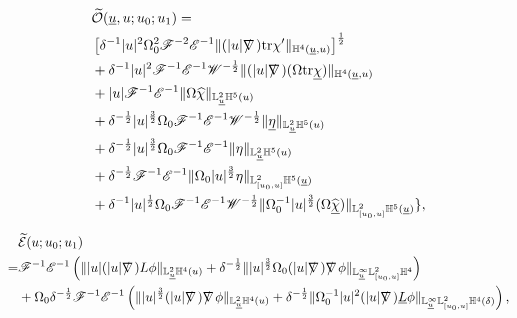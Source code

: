 \documentclass[11pt,reqno]{amsart}
\theoremstyle{definition}
\numberwithin{equation}{section}
\newcommand{\tr}{\mathrm{tr}}
\renewcommand{\L}{\mathbb{L}}
\renewcommand{\H}{\mathbb{H}}
\def\chib{\underline{\chi}}
\def\chibh{\widehat{\underline{\chi}}}
\def\chih{\widehat{\chi}}
\def\etab{\underline{\eta}}
\def\Lb{\underline{L}}
\def\tr{\mathrm{tr}}
\def\ub{\underline{u}}
\def\nablas{\mbox{$\nabla \mkern -13mu /$ }}
\begin{document}
    
 \begin{align*}
   & \widetilde{\mathcal{O}}(\ub,u;u_0;u_1)=\\
    &    \left[\delta^{-1}|u|^2\Omega_0^2\mathscr{F}^{-2}\mathscr{E}^{-1}\|(|u|\nablas)\tr\chi'\|_{\H^4(\ub,u)}\right]^{\frac{1}{2}}\\&+\delta^{-1}|u|^2\mathscr{F}^{-1}\mathscr{E}^{-1}\mathscr{W}^{-\frac{1}{2}}\|(|u|\nablas)(\Omega\tr\chib)\|_{\H^4(\ub,u)}\\
   &+|u|\mathscr{F}^{-1}\mathscr{E}^{-1}\|\Omega\chih\|_{\L^2_{\ub}\H^5(u)}\\
   &+\delta^{-\frac{1}{2}}|u|^{\frac{3}{2}}\Omega_0\mathscr{F}^{-1}\mathscr{E}^{-1}\mathscr{W}^{-\frac{1}{2}}\|\etab\|_{\L^2_{\ub}\H^5(u)}\\
   &+\delta^{-\frac{1}{2}}|u|^{\frac{3}{2}}\Omega_0\mathscr{F}^{-1}\mathscr{E}^{-1}\|\eta\|_{\L_{\ub}^{2}\H^5(u)}\\
   &+\delta^{-\frac{1}{2}}\mathscr{F}^{-1}\mathscr{E}^{-1}\|\Omega_0|u|^{\frac{3}{2}}\eta\|_{\L_{[u_0,u]}^2\H^5(\ub)}\\
    &+\delta^{-1}|u|^{\frac{1}{2}}\Omega_0\mathscr{F}^{-1}\mathscr{E}^{-1}\mathscr{W}^{-\frac{1}{2}}\|\Omega_0^{-1}|u|^{\frac{3}{2}}(\Omega\chibh)\|_{\L_{[u_0,u]}^2\H^5(\ub)}\},
    \end{align*}



\begin{align*}
   & \widetilde{\mathcal{E}}(u;u_0;u_1)\\
    =&\mathscr{F}^{-1}\mathscr{E}^{-1}\left(\||u|(|u|\nablas)L\phi\|_{\L_{\ub}^2\H^4(u)}
    +\delta^{-\frac{1}{2}}\||u|^{\frac{3}{2}}\Omega_0(|u|\nablas)\nablas\phi\|_{\L^\infty_{\ub}\L_{[u_0,u]}^2\H^4}\right)\\
    &+\Omega_0\delta^{-\frac{1}{2}}\mathscr{F}^{-1}\mathscr{E}^{-1}\left(\||u|^{\frac{3}{2}}(|u|\nablas)\nablas\phi\|_{\L_{\ub}^2\H^4(u)}
    +\delta^{-\frac{1}{2}}\|\Omega_0^{-1}|u|^{2}(|u|\nablas)\Lb\phi\|_{\L^\infty_{\ub}\L_{[u_0,u]}^2\H^4(\delta)}\right),
 \end{align*}
\end{document}
